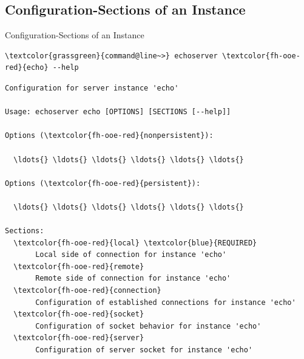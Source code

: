 \subsection{Configuration-Sections of an Instance}

\begin{frame}[fragile]{Configuration-Sections of an Instance}
\begin{scriptsize}
\begin{Verbatim}[commandchars=\\\{\}]
\textcolor{grassgreen}{command@line~>} echoserver \textcolor{fh-ooe-red}{echo} --help
\end{Verbatim}
\begin{Verbatim}[commandchars=\\\{\},frame=leftline]
Configuration for server instance 'echo'

Usage: echoserver echo [OPTIONS] [SECTIONS [--help]]

Options (\textcolor{fh-ooe-red}{nonpersistent}):

  \ldots{} \ldots{} \ldots{} \ldots{} \ldots{} \ldots{}

Options (\textcolor{fh-ooe-red}{persistent}):

  \ldots{} \ldots{} \ldots{} \ldots{} \ldots{} \ldots{}

Sections:
  \textcolor{fh-ooe-red}{local} \textcolor{blue}{REQUIRED}
       Local side of connection for instance 'echo'
  \textcolor{fh-ooe-red}{remote}
       Remote side of connection for instance 'echo'
  \textcolor{fh-ooe-red}{connection}
       Configuration of established connections for instance 'echo'
  \textcolor{fh-ooe-red}{socket}
       Configuration of socket behavior for instance 'echo'
  \textcolor{fh-ooe-red}{server}
       Configuration of server socket for instance 'echo'
\end{Verbatim}
\end{scriptsize}
\end{frame}
